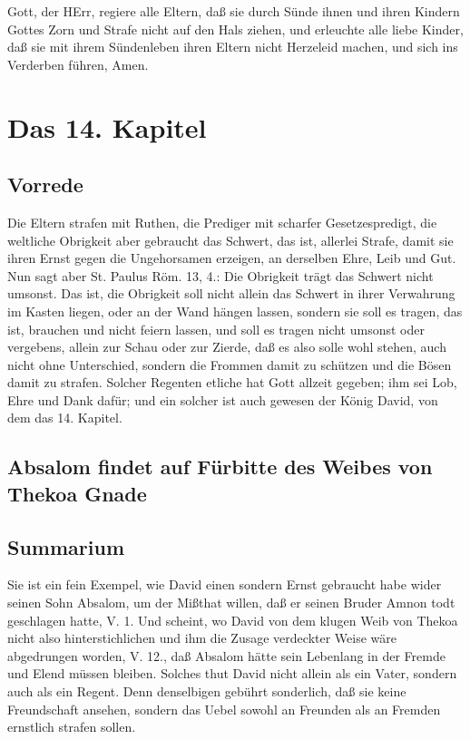 Gott, der HErr, regiere alle Eltern, daß sie durch Sünde ihnen und ihren Kindern Gottes Zorn und Strafe nicht auf den Hals ziehen, und erleuchte alle liebe Kinder, daß sie mit ihrem Sündenleben ihren Eltern nicht Herzeleid machen, und sich ins Verderben führen, Amen.

\chapter{Das 14. Kapitel}

\section{Vorrede}

Die Eltern strafen mit Ruthen, die Prediger mit scharfer Gesetzespredigt, die weltliche Obrigkeit aber gebraucht das Schwert, das ist, allerlei Strafe, damit sie ihren Ernst gegen die Ungehorsamen erzeigen, an derselben Ehre, Leib und Gut. Nun sagt aber St. Paulus Röm. 13, 4.: Die Obrigkeit trägt das Schwert nicht umsonst. Das ist, die Obrigkeit soll nicht allein das Schwert in ihrer Verwahrung im Kasten liegen, oder an der Wand hängen lassen, sondern sie soll es tragen, das ist, brauchen und nicht feiern lassen, und soll es tragen nicht umsonst oder vergebens, allein zur Schau oder zur Zierde, daß es also solle wohl stehen, auch nicht ohne Unterschied, sondern die Frommen damit zu schützen und die Bösen damit zu strafen. Solcher Regenten etliche hat Gott allzeit gegeben; ihm sei Lob, Ehre und Dank dafür; und ein solcher ist auch gewesen der König David, von dem das 14. Kapitel.

\section{Absalom findet auf Fürbitte des Weibes von Thekoa Gnade}

\section{Summarium}

Sie ist ein fein Exempel, wie David einen sondern Ernst gebraucht habe wider seinen Sohn Absalom, um der Mißthat willen, daß er seinen Bruder Amnon todt geschlagen hatte, V. 1. Und scheint, wo David von dem klugen Weib von Thekoa nicht also hinterstichlichen und ihm die Zusage verdeckter Weise wäre abgedrungen worden, V. 12., daß Absalom hätte sein Lebenlang in der Fremde und Elend müssen bleiben. Solches thut David nicht allein als ein Vater, sondern auch als ein Regent. Denn denselbigen gebührt sonderlich, daß sie keine Freundschaft ansehen, sondern das Uebel sowohl an Freunden als an Fremden ernstlich strafen sollen.

